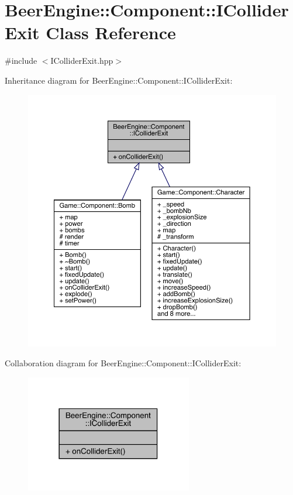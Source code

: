 \hypertarget{class_beer_engine_1_1_component_1_1_i_collider_exit}{}\section{Beer\+Engine\+:\+:Component\+:\+:I\+Collider\+Exit Class Reference}
\label{class_beer_engine_1_1_component_1_1_i_collider_exit}


{\ttfamily \#include $<$I\+Collider\+Exit.\+hpp$>$}



Inheritance diagram for Beer\+Engine\+:\+:Component\+:\+:I\+Collider\+Exit\+:\nopagebreak
\begin{figure}[H]
\begin{center}
\leavevmode
\includegraphics[width=350pt]{class_beer_engine_1_1_component_1_1_i_collider_exit__inherit__graph}
\end{center}
\end{figure}


Collaboration diagram for Beer\+Engine\+:\+:Component\+:\+:I\+Collider\+Exit\+:\nopagebreak
\begin{figure}[H]
\begin{center}
\leavevmode
\includegraphics[width=206pt]{class_beer_engine_1_1_component_1_1_i_collider_exit__coll__graph}
\end{center}
\end{figure}
